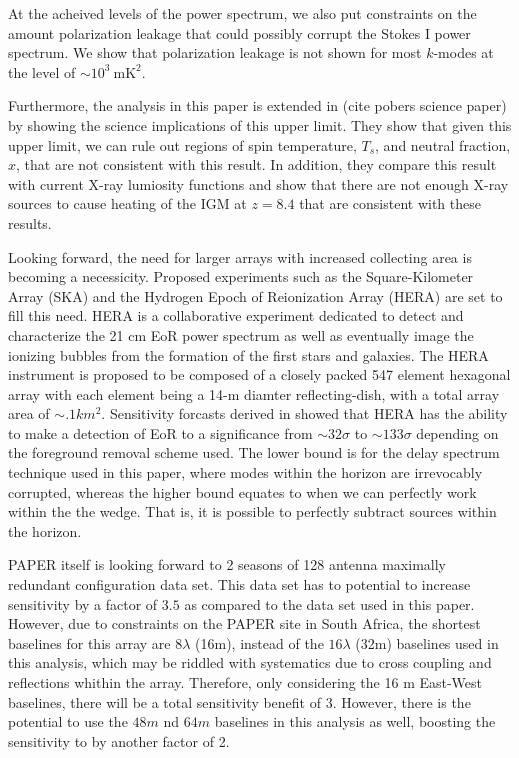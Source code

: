 \documentclass[twocolumn,numberedappendix]{emulateapj} \shorttitle{PSA64}
\begin{document}
At the acheived levels of the power spectrum, we also put constraints on the
amount polarization leakage that could possibly corrupt the Stokes I power
spectrum. We show that polarization leakage is not shown for most $k$-modes at
the level of $\sim10^{3}\ \text{mK}^{2}$. 

Furthermore, the analysis in this paper is extended in (cite pobers science
paper) by showing the science implications of this upper limit. They show that
given this upper limit, we can rule out regions of spin temperature, $T_{s}$,
and neutral fraction, $x$, that are not consistent with this result. In
addition, they compare this result with current X-ray lumiosity functions and
show that there are not enough X-ray sources to cause heating of the IGM at
$z=8.4$ that are consistent with these results.

Looking forward, the need for larger arrays with increased collecting area is
becoming a necessicity. Proposed experiments such as the Square-Kilometer Array
(SKA) and the Hydrogen Epoch of Reionization Array (HERA) are set to fill this
need. HERA is a collaborative experiment dedicated to detect and characterize
the 21 cm EoR power spectrum as well as eventually image the ionizing bubbles
from the formation of the first stars and galaxies. The HERA instrument
is proposed to be composed of a closely packed 547 element hexagonal array 
\citep{pober_et_al2014} with each element being a 14-m diamter
reflecting-dish, with a total array area of $\sim.1km^{2}$. Sensitivity forcasts
derived in \citet{pober_et_al2014} showed that HERA has the ability to make a
detection of EoR to a significance from $\sim32\sigma$ to $\sim133\sigma$
depending on the foreground removal scheme used. The lower bound is for the
delay spectrum technique used in this paper, where modes within the horizon are
irrevocably corrupted, whereas the higher bound equates to when we can perfectly
work within the the wedge. That is, it is possible to perfectly subtract sources
within the horizon.

PAPER itself is looking forward to 2 seasons of 128 antenna maximally redundant
configuration data set. This data set has to potential to increase  sensitivity
by a factor of $3.5$ as compared to the data set used in this paper. However,
due to constraints on the PAPER site in South Africa, the shortest baselines for
this array are $8\lambda$ (16m), instead of the $16\lambda$ (32m) baselines used
in this analysis, which may be riddled with systematics due to cross coupling
and reflections whithin the array. Therefore, only considering the 16 m
East-West baselines, there will be a total sensitivity benefit of $3$. However,
there is the potential to use the $48m$ nd $64m$ baselines in this analysis as
well, boosting the sensitivity to by another factor of 2. 
\end{document}
